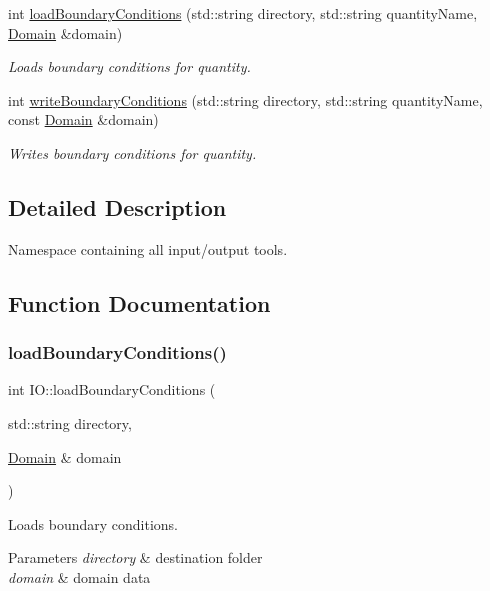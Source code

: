 \begin{DoxyCompactItemize}
int \hyperlink{namespaceIO_a71dbd4f86b34210a0d9837185032f845}{load\+Boundary\+Conditions} (std\+::string directory, std\+::string quantity\+Name, \hyperlink{classDomain}{Domain} \&domain)
\begin{DoxyCompactList}\small\item\em Loads boundary conditions for quantity. \end{DoxyCompactList}\item 
int \hyperlink{namespaceIO_a07f46c0c99961c52b5f6410a84d58a64}{write\+Boundary\+Conditions} (std\+::string directory, std\+::string quantity\+Name, const \hyperlink{classDomain}{Domain} \&domain)
\begin{DoxyCompactList}\small\item\em Writes boundary conditions for quantity. \end{DoxyCompactList}\end{DoxyCompactItemize}


\subsection{Detailed Description}
Namespace containing all input/output tools. 

\subsection{Function Documentation}
\mbox{\label{namespaceIO_a7710f22e4bbbd375162154b69289e5e0}} 
\subsubsection{\texorpdfstring{load\+Boundary\+Conditions()}{loadBoundaryConditions()}\hspace{0.1cm}{\footnotesize\ttfamily [1/2]}}
{\footnotesize\ttfamily int I\+O\+::load\+Boundary\+Conditions (\begin{DoxyParamCaption}\item[{std\+::string}]{directory,  }\item[{\hyperlink{classDomain}{Domain} \&}]{domain }\end{DoxyParamCaption})}



Loads boundary conditions. 


\begin{DoxyParams}{Parameters}
{\em directory} & destination folder \\
\hline
{\em domain} & domain data \\
\hline
\end{DoxyParams}
\mbox{\label{namespaceIO_a71dbd4f86b34210a0d9837185032f845}} 
